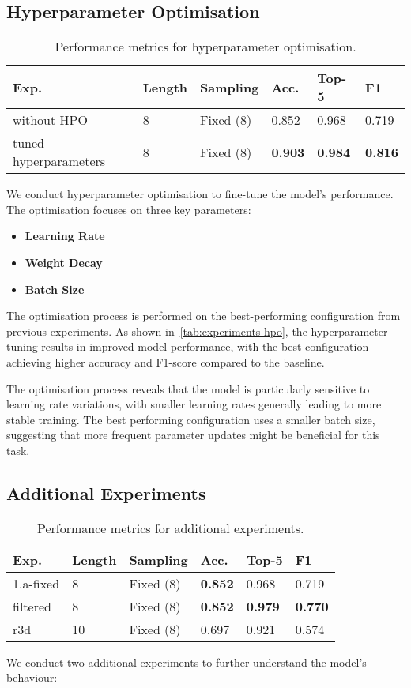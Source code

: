 \subsection{Hyperparameter Optimisation}
\begin{table}[h]
    \centering
    \begin{tabular}{llllll}
    \hline
    \textbf{Exp.} & \textbf{Length} & \textbf{Sampling} & \textbf{Acc.} & \textbf{Top-5} & \textbf{F1} \\    
    \hline
    without HPO & 8 & Fixed (8) & 0.852 & 0.968 & 0.719 \\
    tuned hyperparameters & 8 & Fixed (8) & \textbf{0.903} & \textbf{0.984} & \textbf{0.816} \\
    \end{tabular}
    \caption{Performance metrics for hyperparameter optimisation.}\label{tab:experiments-hpo}
\end{table}

We conduct hyperparameter optimisation to fine-tune the model's performance. The optimisation focuses on three key parameters:

\begin{itemize}
    \item \textbf{Learning Rate}
    \item \textbf{Weight Decay}
    \item \textbf{Batch Size}
\end{itemize}

The optimisation process is performed on the best-performing configuration from previous experiments.
As shown in~\autoref{tab:experiments-hpo}, the hyperparameter tuning results in improved model performance, with the best configuration achieving higher accuracy and F1-score compared to the baseline.

The optimisation process reveals that the model is particularly sensitive to learning rate variations, with smaller learning rates generally leading to more stable training.
The best performing configuration uses a smaller batch size, suggesting that more frequent parameter updates might be beneficial for this task.

\subsection{Additional Experiments}
\begin{table}[h]
    \centering
    \begin{tabular}{llllll}
    \hline
    \textbf{Exp.} & \textbf{Length} & \textbf{Sampling} & \textbf{Acc.} & \textbf{Top-5} & \textbf{F1} \\
    \hline
    1.a-fixed & 8 & Fixed (8) & \textbf{0.852} & 0.968 & 0.719 \\
    filtered & 8 & Fixed (8) & \textbf{0.852} & \textbf{0.979} & \textbf{0.770} \\
    r3d & 10 & Fixed (8) & 0.697 & 0.921 & 0.574 \\
    \end{tabular}
    \caption{Performance metrics for additional experiments.}\label{tab:experiments-additional}
\end{table}
We conduct two additional experiments to further understand the model's behaviour:

